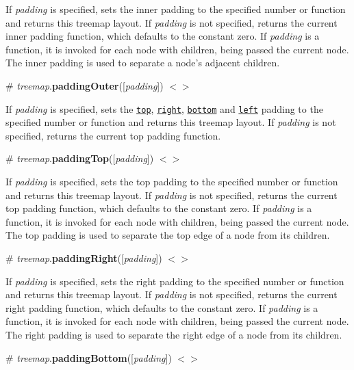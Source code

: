 If {\itshape padding} is specified, sets the inner padding to the specified number or function and returns this treemap layout. If {\itshape padding} is not specified, returns the current inner padding function, which defaults to the constant zero. If {\itshape padding} is a function, it is invoked for each node with children, being passed the current node. The inner padding is used to separate a node’s adjacent children.

\label{_treemap_paddingOuter}%
\# {\itshape treemap}.{\bfseries padding\+Outer}(\mbox{[}{\itshape padding}\mbox{]}) \href{https://github.com/d3/d3-hierarchy/blob/master/src/treemap/index.js#L73}{\tt $<$$>$}

If {\itshape padding} is specified, sets the \href{#treemap_paddingTop}{\tt top}, \href{#treemap_paddingRight}{\tt right}, \href{#treemap_paddingBottom}{\tt bottom} and \href{#treemap_paddingLeft}{\tt left} padding to the specified number or function and returns this treemap layout. If {\itshape padding} is not specified, returns the current top padding function.

\label{_treemap_paddingTop}%
\# {\itshape treemap}.{\bfseries padding\+Top}(\mbox{[}{\itshape padding}\mbox{]}) \href{https://github.com/d3/d3-hierarchy/blob/master/src/treemap/index.js#L77}{\tt $<$$>$}

If {\itshape padding} is specified, sets the top padding to the specified number or function and returns this treemap layout. If {\itshape padding} is not specified, returns the current top padding function, which defaults to the constant zero. If {\itshape padding} is a function, it is invoked for each node with children, being passed the current node. The top padding is used to separate the top edge of a node from its children.

\label{_treemap_paddingRight}%
\# {\itshape treemap}.{\bfseries padding\+Right}(\mbox{[}{\itshape padding}\mbox{]}) \href{https://github.com/d3/d3-hierarchy/blob/master/src/treemap/index.js#L81}{\tt $<$$>$}

If {\itshape padding} is specified, sets the right padding to the specified number or function and returns this treemap layout. If {\itshape padding} is not specified, returns the current right padding function, which defaults to the constant zero. If {\itshape padding} is a function, it is invoked for each node with children, being passed the current node. The right padding is used to separate the right edge of a node from its children.

\label{_treemap_paddingBottom}%
\# {\itshape treemap}.{\bfseries padding\+Bottom}(\mbox{[}{\itshape padding}\mbox{]}) \href{https://github.com/d3/d3-hierarchy/blob/master/src/treemap/index.js#L85}{\tt $<$$>$}

